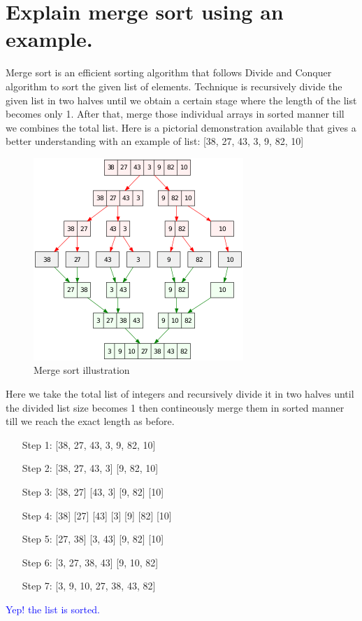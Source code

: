 \documentclass[11 pt]{article}
\begin{document}
\pagebreak

\section{Explain merge sort using an example.}
\justify
{
Merge sort is an efficient sorting algorithm that follows Divide and Conquer algorithm to sort the given list of elements. Technique is recursively divide the given list in two halves until we obtain a certain stage where the length of the list becomes only 1. After that, merge those individual arrays in sorted manner till we combines the total list. Here is a pictorial demonstration available that gives a better understanding with an example of list: [38, 27, 43, 3, 9, 82, 10]\\
}
\begin{figure}[h!]
\includegraphics[scale=0.7]{Pictures/300px-Merge_sort_algorithm_diagram.svg.png}
\centering
\caption{Merge sort illustration}
\end{figure}
Here we take the total list of integers and recursively divide it in two halves until the divided list size becomes 1 then contineously merge them in sorted manner till we reach the exact length as before.
\begin{enumerate}
	\item[Step 1:] [38, 27, 43, 3, 9, 82, 10]
	\item[Step 2:] [38, 27, 43, 3] [9, 82, 10]
	\item[Step 3:] [38, 27] [43, 3] [9, 82] [10]
	\item[Step 4:] [38] [27] [43] [3] [9] [82] [10]
	\item[Step 5:] [27, 38] [3, 43] [9, 82] [10]
	\item[Step 6:] [3, 27, 38, 43] [9, 10, 82]
	\item[Step 7:] [3, 9, 10, 27, 38, 43, 82]
\end{enumerate}
\textcolor{blue}{Yep! the list is sorted.}
\end{document}
